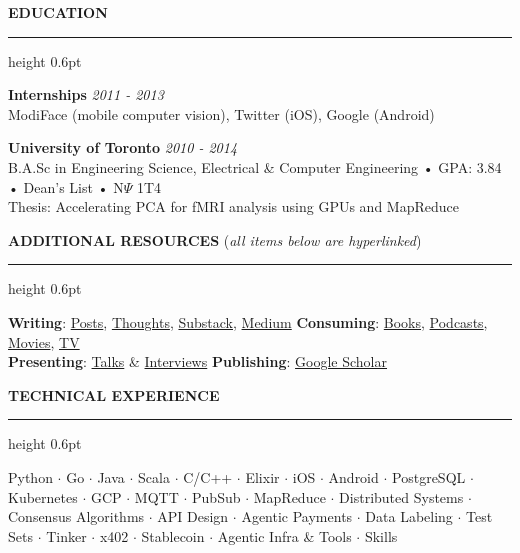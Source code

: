 \documentclass[10pt]{resume}
\newenvironment{rSectionCompact}[1]{
  \medskip
  \vspace{0.45em}
  \textbf{\textcolor{Cerulean}{\MakeUppercase{#1}}}
  \vspace{0.3em}
  {\color{Blue}\hrule height 0.6pt}
  \vspace{0.85em}
  \begin{list}{}{
    \setlength{\leftmargin}{0em}
  }
  \item[]
}{
    \vspace{0.25em}
    \end{list}
}
\begin{document}

\begin{rSectionCompact}{Education}
    \textbf{Internships} \hfill \textit{2011 - 2013} \\
    ModiFace (mobile computer vision), Twitter (iOS), Google (Android)

    \vspace{0.25em}
    \textbf{University of Toronto} \hfill \textit{2010 - 2014} \\
    B.A.Sc in Engineering Science, Electrical \& Computer Engineering • GPA: 3.84 • Dean's List • N$\Psi$ 1T4 \\
    Thesis: Accelerating PCA for fMRI analysis using GPUs and MapReduce

\end{rSectionCompact}


\medskip
\vspace{0.25em}
\textbf{\textcolor{Cerulean}{\MakeUppercase{Additional Resources}}} (\textit{\small all items below are hyperlinked})
\vspace{0.2em}
{\color{Blue}\hrule height 0.6pt}
\vspace{0.2em}
\small
\textbf{Writing}: \href{https://olshansky.info/posts}{Posts}, \href{https://olshansky.info/thoughts}{Thoughts}, \href{https://olshansky.substack.com}{Substack}, \href{https://olshansky.medium.com}{Medium} \hfill
\textbf{Consuming}: \href{https://olshansky.info/book}{Books}, \href{https://olshansky.notion.site/768504560fd54cdaa7e24b6c3f31a21e}{Podcasts}, \href{https://olshansky.info/movie}{Movies}, \href{https://olshansky.info/tv}{TV} \\
\textbf{Presenting}: \href{https://www.youtube.com/playlist?list=PLeHvNSh0enXSflgNf-YC6jW6K3Fh4cS5E}{Talks} \& \href{https://www.youtube.com/playlist?list=PLeHvNSh0enXSflgNf-YC6jW6K3Fh4cS5E}{Interviews} \hfill
\textbf{Publishing}: \href{https://scholar.google.com/citations?user=pkPj80UAAAAJ&hl=en&oi=sra}{Google Scholar}


\begin{rSectionCompact}{Technical Experience}
    \small
    Python $\cdot$ Go $\cdot$ Java $\cdot$ Scala $\cdot$ C/C++ $\cdot$ Elixir $\cdot$ iOS $\cdot$ Android $\cdot$ PostgreSQL $\cdot$ Kubernetes $\cdot$ GCP $\cdot$ MQTT $\cdot$ PubSub $\cdot$ MapReduce $\cdot$ Distributed Systems $\cdot$ Consensus Algorithms $\cdot$ API Design $\cdot$ Agentic Payments $\cdot$ Data Labeling $\cdot$ Test Sets $\cdot$ Tinker $\cdot$ x402 $\cdot$ Stablecoin $\cdot$ Agentic Infra \& Tools $\cdot$ Skills
\end{rSectionCompact}
\end{document}
